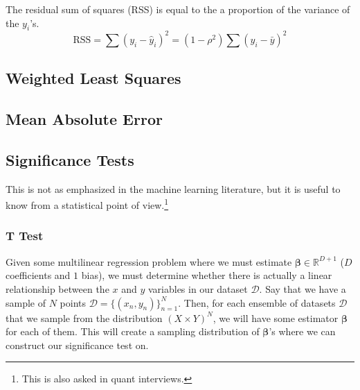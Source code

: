 \documentclass{article}
\begin{document}
    \begin{theorem}
      The residual sum of squares (RSS) is equal to the a proportion of the variance of the $y_i$'s. 
      \begin{equation}
        \mathrm{RSS} = \sum (y_i - \hat{y}_i)^2 = (1 - \rho^2) \sum (y_i - \bar{y})^2 
      \end{equation}
    \end{theorem}

  \subsection{Weighted Least Squares}


  \subsection{Mean Absolute Error}


  \subsection{Significance Tests}

    This is not as emphasized in the machine learning literature, but it is useful to know from a statistical point of view.\footnote{This is also asked in quant interviews.}

    \subsubsection{T Test}

      Given some multilinear regression problem where we must estimate $\boldsymbol{\beta} \in \mathbb{R}^{D + 1}$ ($D$ coefficients and $1$ bias), we must determine whether there is actually a linear relationship between the $x$ and $y$ variables in our dataset $\mathcal{D}$. Say that we have a sample of $N$ points $\mathcal{D} = \{(x_n, y_n)\}_{n=1}^N$. Then, for each ensemble of datasets $\mathcal{D}$ that we sample from the distribution $(X \times Y)^N$, we will have some estimator $\boldsymbol{\beta}$ for each of them. This will create a sampling distribution of $\boldsymbol{\beta}$'s where we can construct our significance test on. 
\end{document}
